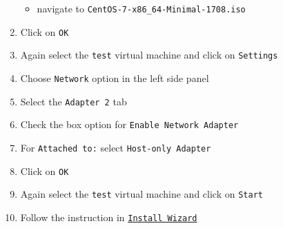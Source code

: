 \begin{enumerate}
  \begin{itemize}
  \tightlist
  \item
    navigate to \texttt{CentOS-7-x86\_64-Minimal-1708.iso}
  \end{itemize}
\item
  Click on \texttt{OK}
\item
  Again select the \texttt{test} virtual machine and click on
  \texttt{Settings}
\item
  Choose \texttt{Network} option in the left side panel
\item
  Select the \texttt{Adapter\ 2} tab
\item
  Check the box option for \texttt{Enable\ Network\ Adapter}
\item
  For \texttt{Attached\ to:} select \texttt{Host-only\ Adapter}
\item
  Click on \texttt{OK}
\item
  Again select the \texttt{test} virtual machine and click on
  \texttt{Start}
\item
  Follow the instruction in
  \href{https://github.com/europ/VUTBR-FIT-BT-IMPL/blob/master/VM_INSTALL.md}{\texttt{Install\ Wizard}}
\end{enumerate}
